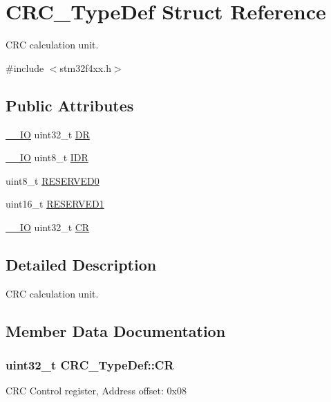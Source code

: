 \hypertarget{struct_c_r_c___type_def}{}\section{C\+R\+C\+\_\+\+Type\+Def Struct Reference}
\label{struct_c_r_c___type_def}


C\+RC calculation unit.  




{\ttfamily \#include $<$stm32f4xx.\+h$>$}

\subsection*{Public Attributes}
\begin{DoxyCompactItemize}
\item 
\hyperlink{core__cm4_8h_aec43007d9998a0a0e01faede4133d6be}{\+\_\+\+\_\+\+IO} uint32\+\_\+t \hyperlink{struct_c_r_c___type_def_a50cb22870dbb9001241cec694994e5ef}{DR}
\item 
\hyperlink{core__cm4_8h_aec43007d9998a0a0e01faede4133d6be}{\+\_\+\+\_\+\+IO} uint8\+\_\+t \hyperlink{struct_c_r_c___type_def_ad84e8694cd4b5375ee533c2d875c3b5a}{I\+DR}
\item 
uint8\+\_\+t \hyperlink{struct_c_r_c___type_def_a70dfd1730dba65041550ef55a44db87c}{R\+E\+S\+E\+R\+V\+E\+D0}
\item 
uint16\+\_\+t \hyperlink{struct_c_r_c___type_def_a8b205c6e25b1808ac016db2356b3021d}{R\+E\+S\+E\+R\+V\+E\+D1}
\item 
\hyperlink{core__cm4_8h_aec43007d9998a0a0e01faede4133d6be}{\+\_\+\+\_\+\+IO} uint32\+\_\+t \hyperlink{struct_c_r_c___type_def_af33fa5c173e1c102e6d0242fe60e569f}{CR}
\end{DoxyCompactItemize}


\subsection{Detailed Description}
C\+RC calculation unit. 

\subsection{Member Data Documentation}
\subsubsection[{\texorpdfstring{CR}{CR}}]{ uint32\+\_\+t C\+R\+C\+\_\+\+Type\+Def\+::\+CR}\hypertarget{struct_c_r_c___type_def_af33fa5c173e1c102e6d0242fe60e569f}{}\label{struct_c_r_c___type_def_af33fa5c173e1c102e6d0242fe60e569f}
C\+RC Control register, Address offset\+: 0x08 

